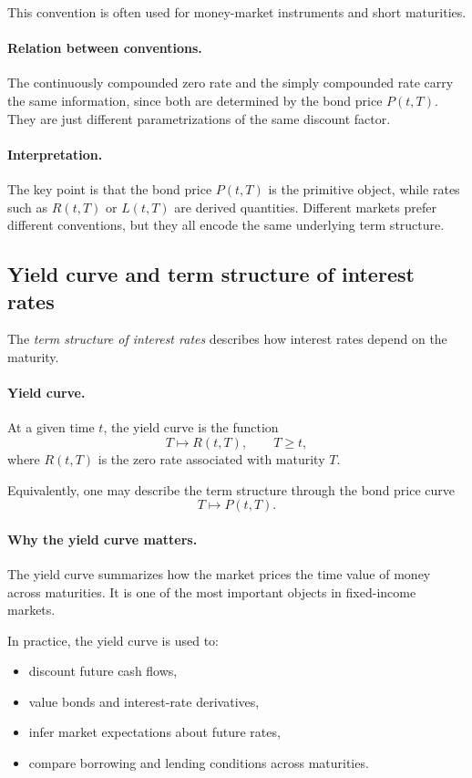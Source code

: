 \documentclass[11pt]{article}
\theoremstyle{plain}
\theoremstyle{definition}
\theoremstyle{remark}
\begin{document}
This convention is often used for money-market instruments and short
maturities.

\paragraph{Relation between conventions.}
The continuously compounded zero rate and the simply compounded rate
carry the same information, since both are determined by the bond price
\(P(t,T)\).
They are just different parametrizations of the same discount factor.

\paragraph{Interpretation.}
The key point is that the bond price \(P(t,T)\) is the primitive object,
while rates such as \(R(t,T)\) or \(L(t,T)\) are derived quantities.
Different markets prefer different conventions, but they all encode the
same underlying term structure.

\subsection{Yield curve and term structure of interest rates}

The \emph{term structure of interest rates} describes how interest rates
depend on the maturity.

\paragraph{Yield curve.}
At a given time \(t\), the yield curve is the function
\[
T\longmapsto R(t,T),
\qquad T\ge t,
\]
where \(R(t,T)\) is the zero rate associated with maturity \(T\).

Equivalently, one may describe the term structure through the bond price
curve
\[
T\longmapsto P(t,T).
\]

\paragraph{Why the yield curve matters.}
The yield curve summarizes how the market prices the time value of money
across maturities.
It is one of the most important objects in fixed-income markets.

In practice, the yield curve is used to:
\begin{itemize}[leftmargin=1.4em]
    \item discount future cash flows,
    \item value bonds and interest-rate derivatives,
    \item infer market expectations about future rates,
    \item compare borrowing and lending conditions across maturities.
\end{itemize}
\end{document}
